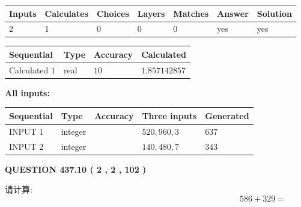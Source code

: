 \documentclass{ctexart}
\begin{document}
   
   
   
\noindent\begin{tabular}{|l|l|l|l|l|l|l|}
 \hline
Inputs & Calculates & Choices & Layers & Matches & Answer & Solution \\ \hline
 2  & 
 1  & 
 0
  & 
 0  & 
 0  & 
  yes & 
  yes 
  \\ \hline
 \end{tabular}
   
   
   
   
\noindent{}
   
   
  
  
\noindent\begin{tabular}{|l|l|l|l|}
\hline
 Sequential & Type & Accuracy & Calculated \\ 
\hline
 
 
  Calculated $  1 $ & real & $  10  $ & 
 $ 1.857142857 $ 
 \\  \hline  
 \end{tabular}
   
   
   
   
\noindent\vspace{0.1in}\hspace{-0.08in} {\textbf{\Large{All inputs: }}}
   
   
  
  
\noindent\begin{tabular}{|l|l|l|l|l|}
\hline
 Sequential & Type & Accuracy & Three inputs & Generated \\ 
\hline
 
 
  INPUT $  1 $ & integer &  & $
 520
 , 
 960
 , 
 3
 $ & $ 637 $ 
 \\  \hline  
 
 
  INPUT $  2 $ & integer &  & $
 140
 , 
 480
 , 
 7
 $ & $ 343 $ 
 \\  \hline  
 \end{tabular}
   
   
  
\vspace{0.2in}
  
{\textbf{\Large{QUESTION
437.10 
 ( 2 , 2 , 102 )
}}}
  
  
 
请计算:
\begin{equation}
586 +  %
329 = \nonumber
\end{equation}
 
 
 
\end{document}
